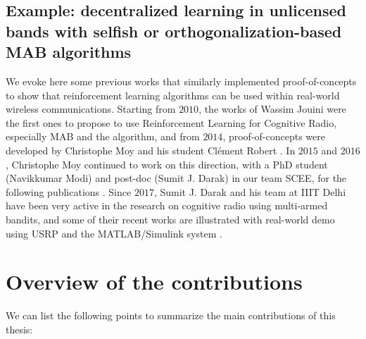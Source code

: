 \subsection{Example: decentralized learning in unlicensed bands with selfish or orthogonalization-based MAB algorithms}


We evoke here some previous works that similarly implemented proof-of-concepts to show that reinforcement learning algorithms can be used within real-world wireless communications.
Starting from $2010$, the works of Wassim Jouini \cite{Jouini09,Jouini10,Jouini12} were the first ones to propose to use Reinforcement Learning for Cognitive Radio, especially MAB and the \UCB{} algorithm, and from $2014$, proof-of-concepts were developed by Christophe Moy and his student Clément Robert \cite{RobertSDR2014,MoyWSR2014}.
In $2015$ and $2016$, Christophe Moy continued to work on this direction, with a PhD student (Navikkumar Modi) and post-doc (Sumit J. Darak) in our team SCEE, for the following publications
\cite{darak2016bayesian,Darak16,modiDemo2016,kumar2016two}.
Since $2017$, Sumit J. Darak and his team at IIIT Delhi have been very active in the research on cognitive radio using multi-armed bandits, and some of their recent works are illustrated with real-world demo using USRP and the MATLAB/Simulink system
\cite{KumarYadav2018,SawantKumar2018,JoshiKumar2018}.



\newpage %

\section{Overview of the contributions}
\label{sec:1:contributions}

We can list the following points to summarize the main contributions of this thesis:

